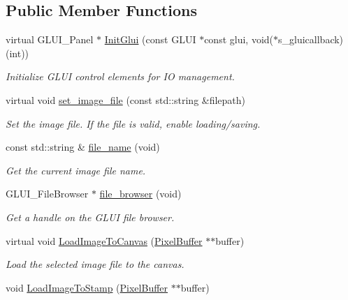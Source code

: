 \subsection*{Public Member Functions}
\begin{DoxyCompactItemize}
\item 
virtual G\+L\+U\+I\+\_\+\+Panel $\ast$ \hyperlink{classimage__tools_1_1IOManager_a5038100a2a640a3343c4715101eec120}{Init\+Glui} (const G\+L\+UI $\ast$const glui, void($\ast$s\+\_\+gluicallback)(int))
\begin{DoxyCompactList}\small\item\em Initialize G\+L\+UI control elements for IO management. \end{DoxyCompactList}\item 
virtual void \hyperlink{classimage__tools_1_1IOManager_a9ddac98843256d25442aba6c963e144a}{set\+\_\+image\+\_\+file} (const std\+::string \&filepath)
\begin{DoxyCompactList}\small\item\em Set the image file. If the file is valid, enable loading/saving. \end{DoxyCompactList}\item 
const std\+::string \& \hyperlink{classimage__tools_1_1IOManager_a667da573afc3fc0977408a0bf669f448}{file\+\_\+name} (void)
\begin{DoxyCompactList}\small\item\em Get the current image file name. \end{DoxyCompactList}\item 
G\+L\+U\+I\+\_\+\+File\+Browser $\ast$ \hyperlink{classimage__tools_1_1IOManager_ab58911faeeb831cc1f62aec390718469}{file\+\_\+browser} (void)
\begin{DoxyCompactList}\small\item\em Get a handle on the G\+L\+UI file browser. \end{DoxyCompactList}\item 
virtual void \hyperlink{classimage__tools_1_1IOManager_a05f34b157208a8d27d6f9d8bf7a20384}{Load\+Image\+To\+Canvas} (\hyperlink{classimage__tools_1_1PixelBuffer}{Pixel\+Buffer} $\ast$$\ast$buffer)\hypertarget{classimage__tools_1_1IOManager_a05f34b157208a8d27d6f9d8bf7a20384}{}\label{classimage__tools_1_1IOManager_a05f34b157208a8d27d6f9d8bf7a20384}

\begin{DoxyCompactList}\small\item\em Load the selected image file to the canvas. \end{DoxyCompactList}\item 
void \hyperlink{classimage__tools_1_1IOManager_a9631b9d5b56b1f9ecfb0f6cf900a5640}{Load\+Image\+To\+Stamp} (\hyperlink{classimage__tools_1_1PixelBuffer}{Pixel\+Buffer} $\ast$$\ast$buffer)\hypertarget{classimage__tools_1_1IOManager_a9631b9d5b56b1f9ecfb0f6cf900a5640}{}\label{classimage__tools_1_1IOManager_a9631b9d5b56b1f9ecfb0f6cf900a5640}


\end{DoxyCompactItemize}
